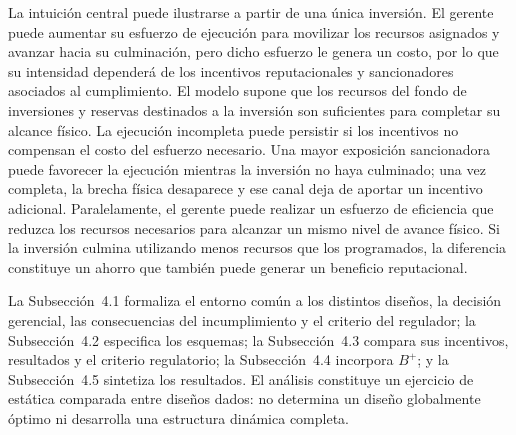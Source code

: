 La intuición central puede ilustrarse a partir de una única inversión. El gerente puede aumentar su esfuerzo de ejecución para movilizar los recursos asignados y avanzar hacia su culminación, pero dicho esfuerzo le genera un costo, por lo que su intensidad dependerá de los incentivos reputacionales y sancionadores asociados al cumplimiento. El modelo supone que los recursos del fondo de inversiones y reservas destinados a la inversión son suficientes para completar su alcance físico. La ejecución incompleta puede persistir si los incentivos no compensan el costo del esfuerzo necesario. Una mayor exposición sancionadora puede favorecer la ejecución mientras la inversión no haya culminado; una vez completa, la brecha física desaparece y ese canal deja de aportar un incentivo adicional. Paralelamente, el gerente puede realizar un esfuerzo de eficiencia que reduzca los recursos necesarios para alcanzar un mismo nivel de avance físico. Si la inversión culmina utilizando menos recursos que los programados, la diferencia constituye un ahorro que también puede generar un beneficio reputacional.

La Subsección~4.1 formaliza el entorno común a los distintos diseños, la decisión gerencial, las consecuencias del incumplimiento y el criterio del regulador; la Subsección~4.2 especifica los esquemas; la Subsección~4.3 compara sus incentivos, resultados y el criterio regulatorio; la Subsección~4.4 incorpora \(B^{+}\); y la Subsección~4.5 sintetiza los resultados. El análisis constituye un ejercicio de estática comparada entre diseños dados: no determina un diseño globalmente óptimo ni desarrolla una estructura dinámica completa.









